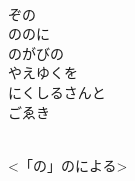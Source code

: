 \documentclass[10pt,b5j]{tarticle} %
\begin{document}
\begin{enumerate}
\begin{minipage}[c]{\blocksize}
        \vspace{\linespace}
        \item~\\
        ぞの\\
        ののに\\
        のがびの\\
        やえゆくを\\
        にくしるさんと\\
        ごゑき
        
    \end{minipage}
    \begin{minipage}[c]{\blocksize}
        
        \vspace{\linespace}
        \item~\\
        <「の」のによる>
    
    \end{minipage}
\end{enumerate} %
\end{document}
